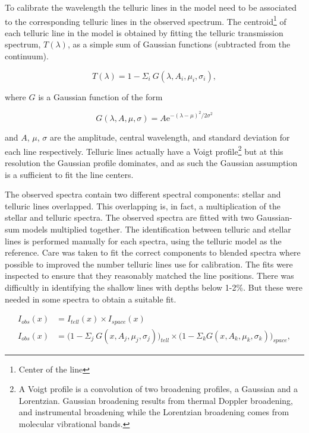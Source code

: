 To calibrate the wavelength the telluric lines in the model need to be associated to the corresponding telluric lines in the observed spectrum. The centroid\footnote{Center of the line} of each telluric line in the model is obtained by fitting the telluric transmission spectrum, \(T(\lambda) \), as a simple sum of Gaussian functions (subtracted from the continuum).

\begin{equation}
T(\lambda) = 1 - {\Sigma}_{i}\ G(\lambda, A_{i}, {\mu}_{i}, {\sigma}_{i}),
\end{equation}

where \(G \) is a Gaussian function of the form

\begin{equation}
G(\lambda, A, \mu, \sigma) = {A \textrm{e}}^{{-(\lambda-\mu)}^{2}/2\sigma^{2}}
\end{equation}

and \(A \), \(\mu \), \(\sigma \) are the amplitude, central wavelength, and standard deviation for each line respectively. Telluric lines actually have a Voigt profile\footnote{A Voigt profile is a convolution of two broadening profiles, a Gaussian and a Lorentzian. Gaussian broadening results from thermal Doppler broadening, and instrumental broadening while the Lorentzian broadening comes from molecular vibrational bands\citep{meier_art_2005}.} but at this resolution the Gaussian profile dominates, and as such the Gaussian assumption is a sufficient to fit the line centers.

The observed spectra contain two different spectral components: stellar and telluric lines overlapped. This overlapping is, in fact, a multiplication of the stellar and telluric spectra. The observed spectra are fitted with two Gaussian-sum models multiplied together. The identification between telluric and stellar lines is performed manually for each spectra, using the telluric model as the reference. Care was taken to fit the correct components to blended spectra where possible to improved the number telluric lines use for calibration. The fits were inspected to ensure that they reasonably matched the line positions. There was difficultly in identifying the shallow lines with depths below 1-2\%. But these were needed in some spectra to obtain a suitable fit. 

\begin{align}
I_{obs}(x) &= I_{tell}(x) \times I_{space}(x) \nonumber \\
I_{obs}(x) &= \Big(1 - {\Sigma}_{j}\ G(x, A_{j}, {\mu}_{j}, {\sigma}_{j})\Big)_{tell} \times \Big(1 - {\Sigma}_{k} G(x, A_{k}, {\mu}_{k}, {\sigma}_{k})\Big)_{space}, \label{eqn:obs}
\end{align}


